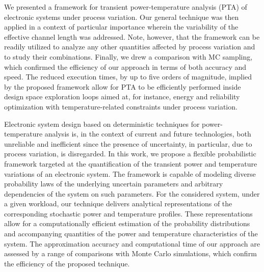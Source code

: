 We presented a framework for transient power-temperature analysis (PTA) of
electronic systems under process variation. Our general technique was then
applied in a context of particular importance wherein the variability of the
effective channel length was addressed. Note, however, that the framework can be
readily utilized to analyze any other quantities affected by process variation
and to study their combinations. Finally, we drew a comparison with MC sampling,
which confirmed the efficiency of our approach in terms of both accuracy and
speed. The reduced execution times, by up to five orders of magnitude, implied
by the proposed framework allow for PTA to be efficiently performed inside
design space exploration loops aimed at, for instance, energy and reliability
optimization with temperature-related constraints under process variation.

Electronic system design based on deterministic techniques for power-temperature
analysis is, in the context of current and future technologies, both unreliable
and inefficient since the presence of uncertainty, in particular, due to process
variation, is disregarded. In this work, we propose a flexible probabilistic
framework targeted at the quantification of the transient power and temperature
variations of an electronic system. The framework is capable of modeling diverse
probability laws of the underlying uncertain parameters and arbitrary
dependencies of the system on such parameters. For the considered system, under
a given workload, our technique delivers analytical representations of the
corresponding stochastic power and temperature profiles. These representations
allow for a computationally efficient estimation of the probability
distributions and accompanying quantities of the power and temperature
characteristics of the system. The approximation accuracy and computational time
of our approach are assessed by a range of comparisons with Monte Carlo
simulations, which confirm the efficiency of the proposed technique.
